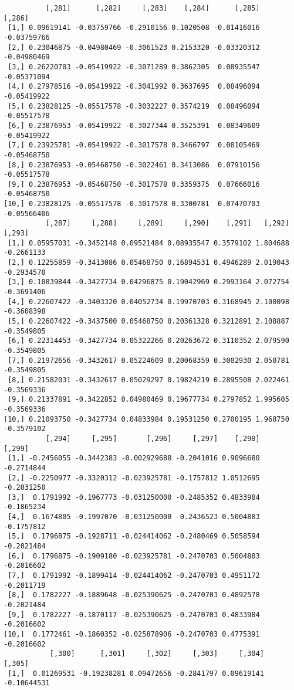 \documentclass[
  letterpaper,
  DIV=11,
  numbers=noendperiod]{scrreprt}
\begin{document}
\begin{verbatim}
          [,281]      [,282]     [,283]    [,284]      [,285]      [,286]
 [1,] 0.09619141 -0.03759766 -0.2910156 0.1020508 -0.01416016 -0.03759766
 [2,] 0.23046875 -0.04980469 -0.3061523 0.2153320 -0.03320312 -0.04980469
 [3,] 0.26220703 -0.05419922 -0.3071289 0.3862305  0.08935547 -0.05371094
 [4,] 0.27978516 -0.05419922 -0.3041992 0.3637695  0.08496094 -0.05419922
 [5,] 0.23828125 -0.05517578 -0.3032227 0.3574219  0.08496094 -0.05517578
 [6,] 0.23876953 -0.05419922 -0.3027344 0.3525391  0.08349609 -0.05419922
 [7,] 0.23925781 -0.05419922 -0.3017578 0.3466797  0.08105469 -0.05468750
 [8,] 0.23876953 -0.05468750 -0.3022461 0.3413086  0.07910156 -0.05517578
 [9,] 0.23876953 -0.05468750 -0.3017578 0.3359375  0.07666016 -0.05468750
[10,] 0.23828125 -0.05517578 -0.3017578 0.3300781  0.07470703 -0.05566406
          [,287]     [,288]     [,289]     [,290]    [,291]   [,292]     [,293]
 [1,] 0.05957031 -0.3452148 0.09521484 0.08935547 0.3579102 1.804688 -0.2661133
 [2,] 0.12255859 -0.3413086 0.05468750 0.16894531 0.4946289 2.019043 -0.2934570
 [3,] 0.10839844 -0.3427734 0.04296875 0.19042969 0.2993164 2.072754 -0.3691406
 [4,] 0.22607422 -0.3403320 0.04052734 0.19970703 0.3168945 2.100098 -0.3608398
 [5,] 0.22607422 -0.3437500 0.05468750 0.20361328 0.3212891 2.108887 -0.3549805
 [6,] 0.22314453 -0.3427734 0.05322266 0.20263672 0.3110352 2.079590 -0.3549805
 [7,] 0.21972656 -0.3432617 0.05224609 0.20068359 0.3002930 2.050781 -0.3549805
 [8,] 0.21582031 -0.3432617 0.05029297 0.19824219 0.2895508 2.022461 -0.3569336
 [9,] 0.21337891 -0.3422852 0.04980469 0.19677734 0.2797852 1.995605 -0.3569336
[10,] 0.21093750 -0.3427734 0.04833984 0.19531250 0.2700195 1.968750 -0.3579102
          [,294]     [,295]       [,296]     [,297]    [,298]     [,299]
 [1,] -0.2456055 -0.3442383 -0.002929688 -0.2041016 0.9096680 -0.2714844
 [2,] -0.2250977 -0.3320312 -0.023925781 -0.1757812 1.0512695 -0.2031250
 [3,]  0.1791992 -0.1967773 -0.031250000 -0.2485352 0.4833984 -0.1865234
 [4,]  0.1674805 -0.1997070 -0.031250000 -0.2436523 0.5004883 -0.1757812
 [5,]  0.1796875 -0.1928711 -0.024414062 -0.2480469 0.5058594 -0.2021484
 [6,]  0.1796875 -0.1909180 -0.023925781 -0.2470703 0.5004883 -0.2016602
 [7,]  0.1791992 -0.1899414 -0.024414062 -0.2470703 0.4951172 -0.2011719
 [8,]  0.1782227 -0.1889648 -0.025390625 -0.2470703 0.4892578 -0.2021484
 [9,]  0.1782227 -0.1870117 -0.025390625 -0.2470703 0.4833984 -0.2016602
[10,]  0.1772461 -0.1860352 -0.025878906 -0.2470703 0.4775391 -0.2016602
           [,300]      [,301]     [,302]     [,303]     [,304]      [,305]
 [1,]  0.01269531 -0.19238281 0.09472656 -0.2841797 0.09619141 -0.10644531

\end{verbatim}
\end{document}
